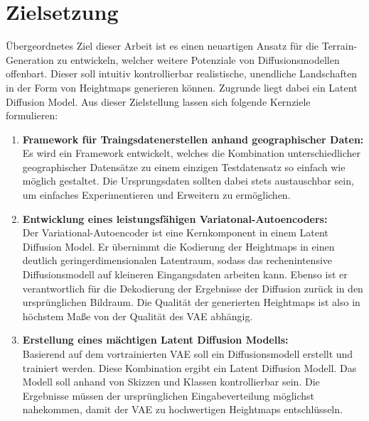 \section{Zielsetzung}

Übergeordnetes Ziel dieser Arbeit ist es einen neuartigen Ansatz für die Terrain-Generation zu entwickeln, welcher weitere Potenziale von Diffusionsmodellen offenbart. Dieser soll intuitiv kontrollierbar realistische, unendliche Landschaften in der Form von Heightmaps generieren können. Zugrunde liegt dabei ein Latent Diffusion Model. Aus dieser Zielstellung lassen sich folgende Kernziele formulieren:

\begin{enumerate}
    \item \textbf {Framework für Traingsdatenerstellen anhand geographischer Daten:} \\
    Es wird ein Framework entwickelt, welches die Kombination unterschiedlicher geographischer Datensätze zu einem einzigen Testdatensatz so einfach wie möglich gestaltet. Die Ursprungsdaten sollten dabei stets austauschbar sein, um einfaches Experimentieren und Erweitern zu ermöglichen.

    \item \textbf {Entwicklung eines leistungsfähigen Variatonal-Autoencoders:} \\
    Der Variational-Autoencoder ist eine Kernkomponent in einem Latent Diffusion Model. Er übernimmt die Kodierung der Heightmaps in einen deutlich geringerdimensionalen Latentraum, sodass das rechenintensive Diffusionsmodell auf kleineren Eingangsdaten arbeiten kann. Ebenso ist er verantwortlich für die Dekodierung der Ergebnisse der Diffusion zurück in den ursprünglichen Bildraum. Die Qualität der generierten Heightmaps ist also in höchstem Maße von der Qualität des VAE abhängig.

    \item \textbf {Erstellung eines mächtigen Latent Diffusion Modells:} \\
    Basierend auf dem vortrainierten VAE soll ein Diffusionsmodell erstellt und trainiert werden. Diese Kombination ergibt ein Latent Diffusion Modell.
    Das Modell soll anhand von Skizzen und Klassen kontrollierbar sein. Die Ergebnisse müssen der ursprünglichen Eingabeverteilung möglichst nahekommen, damit der VAE zu hochwertigen Heightmaps entschlüsseln.
    

\end{enumerate}
